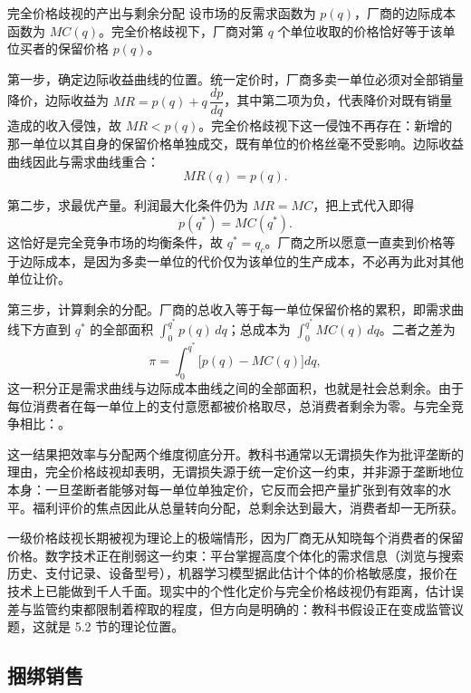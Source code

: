 \begin{derivation}{完全价格歧视的产出与剩余分配}{}
设市场的反需求函数为 $p(q)$，厂商的边际成本函数为 $MC(q)$。完全价格歧视下，厂商对第 $q$ 个单位收取的价格恰好等于该单位买者的保留价格 $p(q)$。

第一步，确定边际收益曲线的位置。统一定价时，厂商多卖一单位必须对全部销量降价，边际收益为 $MR = p(q) + q\,\dfrac{dp}{dq}$，其中第二项为负，代表降价对既有销量造成的收入侵蚀，故 $MR < p(q)$。完全价格歧视下这一侵蚀不再存在：新增的那一单位以其自身的保留价格单独成交，既有单位的价格丝毫不受影响。边际收益曲线因此与需求曲线重合：
\[
MR(q) = p(q).
\]

第二步，求最优产量。利润最大化条件仍为 $MR = MC$，把上式代入即得
\[
p(q^*) = MC(q^*).
\]
这恰好是完全竞争市场的均衡条件，故 $q^* = q_c$。厂商之所以愿意一直卖到价格等于边际成本，是因为多卖一单位的代价仅为该单位的生产成本，不必再为此对其他单位让价。

第三步，计算剩余的分配。厂商的总收入等于每一单位保留价格的累积，即需求曲线下方直到 $q^*$ 的全部面积 $\int_0^{q^*} p(q)\,dq$；总成本为 $\int_0^{q^*} MC(q)\,dq$。二者之差为
\[
\pi = \int_0^{q^*}\bigl[p(q) - MC(q)\bigr]dq,
\]
这一积分正是需求曲线与边际成本曲线之间的全部面积，也就是社会总剩余。由于每位消费者在每一单位上的支付意愿都被价格取尽，总消费者剩余为零。与完全竞争相比：。
\end{derivation}

这一结果把效率与分配两个维度彻底分开。教科书通常以无谓损失作为批评垄断的理由，完全价格歧视却表明，无谓损失源于统一定价这一约束，并非源于垄断地位本身：一旦垄断者能够对每一单位单独定价，它反而会把产量扩张到有效率的水平。福利评价的焦点因此从总量转向分配，总剩余达到最大，消费者却一无所获。

一级价格歧视长期被视为理论上的极端情形，因为厂商无从知晓每个消费者的保留价格。数字技术正在削弱这一约束：平台掌握高度个体化的需求信息（浏览与搜索历史、支付记录、设备型号），机器学习模型据此估计个体的价格敏感度，报价在技术上已能做到千人千面。现实中的个性化定价与完全价格歧视仍有距离，估计误差与监管约束都限制着榨取的程度，但方向是明确的：教科书假设正在变成监管议题，这就是 5.2 节的理论位置。

\subsection{捆绑销售}

